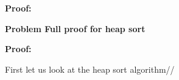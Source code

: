 \documentclass[12pt]{article}
\begin{document}
\par
\bigskip
{\bf Proof:}
\par

\rightline{$\blacksquare$}

\par


\par
\bigskip
{\bf Problem
    Full proof for heap sort
}

\par
\bigskip
{\bf Proof:}
\par
First let us look at the heap sort algorithm//

\rightline{$\blacksquare$}

\par
\end{document}

